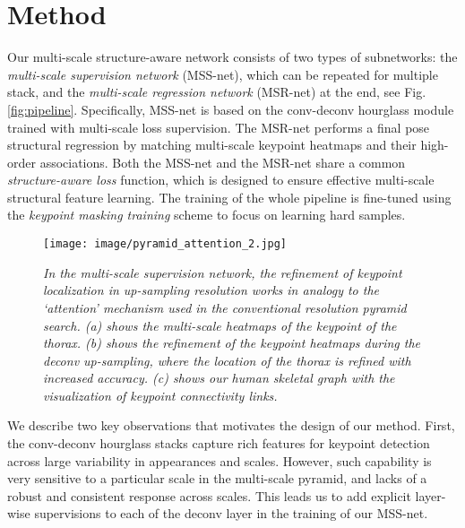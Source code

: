 \documentclass[runningheads]{llncs}
\begin{document}
\section{Method}
\label{sec:method}






Our multi-scale structure-aware network consists of two types of subnetworks: the {\em multi-scale supervision network} (MSS-net), which can be repeated for multiple stack, and the {\em multi-scale regression network} (MSR-net) at the end, see Fig. \ref{fig:pipeline}.
Specifically, MSS-net is based on the conv-deconv hourglass module \cite{newell2016stacked} trained with multi-scale loss supervision. 
The MSR-net performs a final pose structural regression by matching multi-scale keypoint heatmaps and their high-order associations.
Both the MSS-net and the MSR-net share a common  {\em structure-aware loss} function, which is designed to ensure effective multi-scale structural feature learning. 
The training of the whole pipeline is fine-tuned using the {\em keypoint masking training} scheme to focus on learning hard samples.


\begin{figure}[t]
\centerline{
\texttt{[image: image/pyramid\_attention\_2.jpg]}
}
\caption{\em \small 
In the multi-scale supervision network, the refinement of keypoint localization in up-sampling resolution works in analogy to the `attention' mechanism used in the conventional resolution pyramid search.
(a) shows the multi-scale heatmaps of the keypoint of the thorax.
(b) shows the refinement of the keypoint heatmaps during the deconv up-sampling, where the location of the thorax is refined with increased accuracy. 
(c) shows our human skeletal graph with the visualization of keypoint connectivity links.
}
\label{fig:res:pyramid:attention}
\end{figure}



We describe two key observations that motivates the design of our method. 
First, the conv-deconv hourglass stacks capture rich features for keypoint detection across large variability in appearances and scales.
However, such capability is very sensitive to a particular scale in the multi-scale pyramid, and lacks of a robust and consistent response across scales. 
This leads us to add explicit layer-wise supervisions to each of the deconv layer in the training of our MSS-net.
\end{document}
